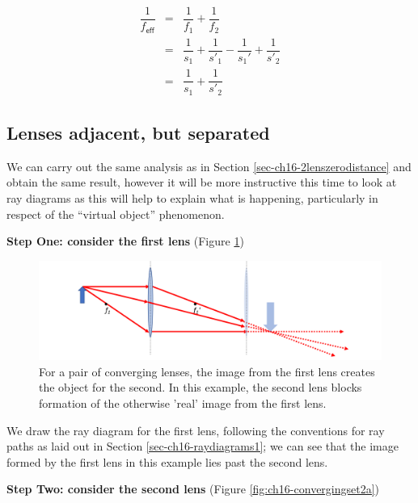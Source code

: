 \documentclass[
]{book}
\begin{document}
\begin{equation}
\begin{array}{rcl}
\dfrac{1}{f_{\textsf{eff}}} &=& \dfrac{1}{f_1} + \dfrac{1}{f_2} \\
  &=& \dfrac{1}{s_1} + \dfrac{1}{s'_1} -\dfrac{1}{s_1'} + \dfrac{1}{s'_2}\\
  &=& \dfrac{1}{s_1}  + \dfrac{1}{s'_2}
\end{array}
\label{eq:ch16-lenscombination3}
\end{equation}

\hypertarget{sec-ch16-2lensseparated}{%
\subsection{Lenses adjacent, but separated}\label{sec-ch16-2lensseparated}}

We can carry out the same analysis as in Section \ref{sec-ch16-2lenszerodistance} and obtain the same result, however it will be more instructive this time to look at ray diagrams as this will help to explain what is happening, particularly in respect of the ``virtual object'' phenomenon.

\textbf{Step One: consider the first lens} (Figure \ref{fig:ch16-convergingset1a})

\begin{figure}

{\centering \includegraphics[width=0.7\linewidth]{visualisations/LaTeX/ch16-convergingset1a} 

}

\caption{For a pair of converging lenses, the image from the first lens creates the object for the second. In this example, the second lens blocks formation of the otherwise 'real' image from the first lens.}\label{fig:ch16-convergingset1a}
\end{figure}

We draw the ray diagram for the first lens, following the conventions for ray paths as laid out in Section \ref{sec-ch16-raydiagrams1}; we can see that the image formed by the first lens in this example lies past the second lens.

\textbf{Step Two: consider the second lens} (Figure \ref{fig:ch16-convergingset2a})
\end{document}
